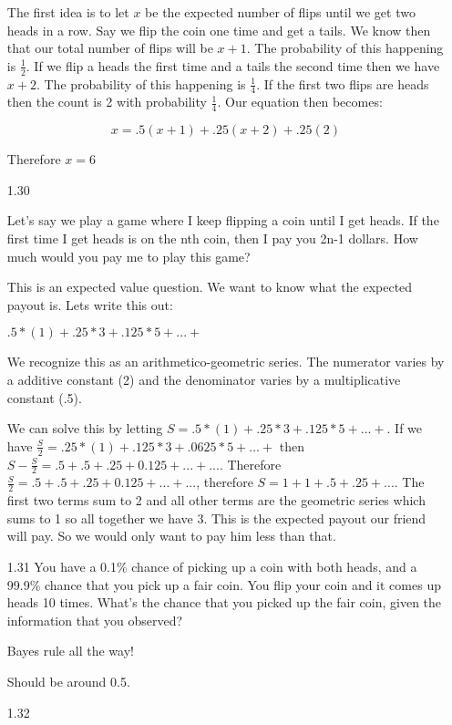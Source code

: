 \begin{enumerate}
The first idea is to let $x$ be the expected number of flips until we get two heads in a row. Say we flip the coin one time and get a tails. We know then that our total number of flips will be $x+1$. The probability of this happening is $\frac{1}{2}$. If we flip a heads the first time and a tails the second time then we have $x+2$. The probability of this happening is $\frac{1}{4}$. If the first two flips are heads then the count is 2 with probability $\frac{1}{4}$. Our equation then becomes:

\begin{equation}
x = .5(x+1) + .25(x+2) + .25(2)
\end{equation}

Therefore  $x=6$

\item[1.30]

Let’s say we play a game where I keep flipping a coin until I get heads. If the first time I get heads is on the nth coin, then I pay you 2n-1 dollars. How much would you pay me to play this game?

This is an expected value question. We want to know what the expected payout is. Lets write this out:

$.5*(1) + .25*3 + .125*5 + ... + $

We recognize this as an arithmetico-geometric series. The numerator varies by a additive constant (2) and the denominator varies by a multiplicative constant (.5). 

We can solve this by letting $S = .5*(1) + .25*3 + .125*5 + ... + $. If we have $\frac{S}{2} = .25*(1) + .125*3 + .0625*5 + ... + $ then $S - \frac{S}{2} = .5 + .5 + .25 + 0.125 + ... + ... $. Therefore $\frac{S}{2} = .5 + .5 + .25 + 0.125 + ... + ... $, therefore $S = 1 + 1 + .5 + .25 + ... $. The first two terms sum to 2 and all other terms are the geometric series which sums to 1 so all together we have 3. This is the expected payout our friend will pay. So we would only want to pay him less than that. 
  
\item[1.31]
You have a 0.1\% chance of picking up a coin with both heads, and a 99.9\% chance that you pick up a fair coin. You flip your coin and it comes up heads 10 times. What’s the chance that you picked up the fair coin, given the information that you observed?

Bayes rule all the way!

Should be around 0.5.

\item[1.32]


\end{enumerate}
